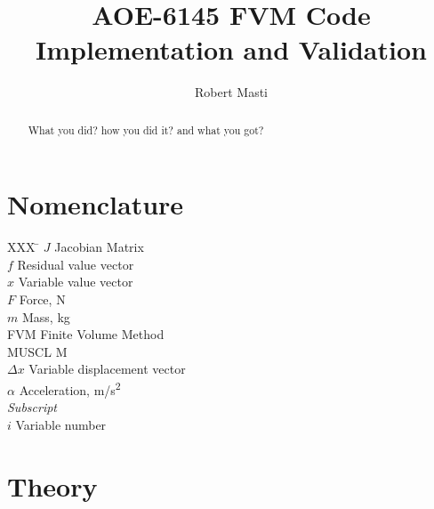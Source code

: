 \documentclass[]{aiaa-tc}%
\title{AOE-6145 FVM Code Implementation and Validation}
\author{
  Robert Masti%
 }
\begin{document}
\maketitle

\begin{abstract}
  What you did? how you did it? and what you got?
\end{abstract}

\section*{Nomenclature}

\begin{tabbing}
  XXX \= \kill%
  $J$ \> Jacobian Matrix \\
  $f$ \> Residual value vector \\
  $x$ \> Variable value vector \\
  $F$ \> Force, N \\
  $m$ \> Mass, kg \\
  FVM \> Finite Volume Method \\
  MUSCL \> M \\
  $\Delta x$ \> Variable displacement vector \\
  $\alpha$ \> Acceleration, m/s\textsuperscript{2} \\[5pt]
  \textit{Subscript}\\
  $i$ \> Variable number \\
 \end{tabbing}

\section{Theory}
\end{document}

